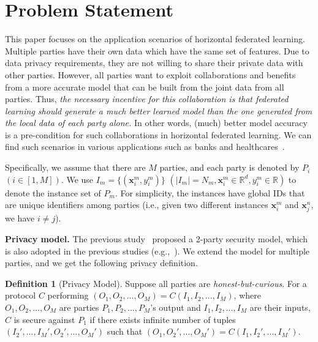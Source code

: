 \documentclass[letterpaper]{article} %
\theoremstyle{definition}
\newtheorem{definition}{Definition}
\newcommand{\del}[1]{}
\begin{document}
\section{Problem Statement}
This paper focuses on the application scenarios of horizontal federated learning. Multiple parties have their own data which have the same set of features. Due to data privacy requirements, they are not willing to share their private data with other parties. However, all parties want to exploit collaborations and benefits from a more accurate model that can be built from the joint data from all parties. Thus, \emph{the necessary incentive for this collaboration is that federated learning should generate a much better learned model than the one generated from the local data of each party alone.} In other words, (much) better model accuracy is a pre-condition for such collaborations in horizontal federated learning. We can find such scenarios in various applications such as banks and healthcares~\cite{Yang:2019:FML:3306498.3298981}.

Specifically, we assume that there are $M$ parties, and each party is denoted by $P_i$ $(i\in [1,M])$. We use $I_m = \{(\mathbf{x}_i^m, y_i^m)\}$ $(|I_m|=N_m, \mathbf{x}_i^m\in \mathbb{R}^d, y_i^m\in \mathbb{R})$ to denote the instance set of $P_m$. For simplicity, the instances have global IDs that are unique identifiers among parties (i.e., given two different instances $\mathbf{x}_i^m$ and $\mathbf{x}_j^n$, we have $i \neq j$).

{\bf Privacy model.} The previous study~\cite{du2004privacy} proposed a 2-party security model, which is also adopted in the previous studies (e.g.,~\cite{liu2018secure}). We extend the model for multiple parties, and we get the following privacy definition.

\begin{definition}[Privacy Model]
Suppose all parties are \textit{honest-but-curious}. For a protocol $C$ performing $(O_1, O_2, ..., O_M) = C(I_1, I_2, ..., I_M)$, where $O_1, O_2, ..., O_M$ are parties $P_1, P_2, ..., P_M$'s output and $I_1, I_2, ..., I_M$ are their inputs, $C$ is secure against $P_1$ if there exists infinite number of tuples $(I_2', ..., I_M', O_2', ..., O_M')$\del{ $(j \in [1,M],j\neq k)$} such that $(O_1, O_2', ..., O_M') = C(I_1, I_2', ..., I_M')$.
\label{def:security}
\end{definition}
\end{document}
